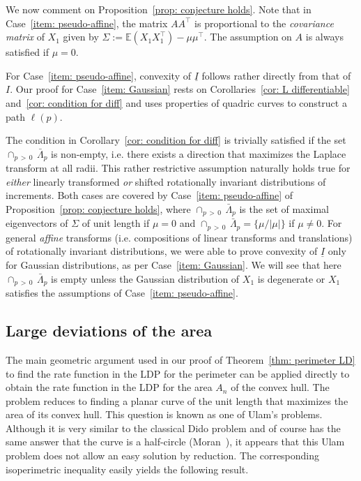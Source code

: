 \documentclass[10pt]{amsart}
\theoremstyle{definition}\newtheorem{defi}[theo]{Definition}\newtheorem{rema}[theo]{Remark}\newtheorem{exam}[theo]{Example}\newtheorem{exem}[theo]{Example}\newtheorem{nota}[theo]{Notation}
\newcommand{\ubar}[1]{\underline{#1}}
\newcommand{\E}{\mathbb{E}}
\begin{document}
We now comment on Proposition~\ref{prop: conjecture holds}. Note that in Case~\eqref{item: pseudo-affine}, the matrix $A A^\top$ is proportional to the \emph{covariance matrix} of $X_1$ given by $\Sigma:=\E (X_1 X_1^\top) - \mu \mu^\top$. The assumption on $A$ is always satisfied if $\mu=0$.

For Case~\eqref{item: pseudo-affine}, convexity of $\ubar I$ follows rather directly from that of $I$. Our proof for Case~\eqref{item: Gaussian} rests on Corollaries~\ref{cor: L differentiable} and~\ref{cor: condition for diff} and uses properties of quadric curves to construct a path $\ell(p)$.

The condition in Corollary~\ref{cor: condition for diff} is trivially satisfied if the set $\cap_{p\,>\,0}\,\bar{\Lambda}_p$ is non-empty, i.e. there exists a direction that maximizes the Laplace transform at all radii. This rather restrictive assumption naturally holds true for \emph{either} linearly transformed \emph{or} shifted rotationally invariant distributions of increments. Both cases are covered by Case~\eqref{item: pseudo-affine} of Proposition~\ref{prop: conjecture holds}, where $\cap_{p\,>\,0}\,\bar{\Lambda}_p$ is the set of maximal eigenvectors of $\Sigma$ of unit length if $\mu=0$ and $\cap_{p\,>\,0}\,\bar{\Lambda}_p = \{\mu /|\mu|\}$ if $\mu \neq 0$. For general \emph{affine} transforms (i.e. compositions of linear transforms and translations) of rotationally invariant distributions, we were able to prove convexity of $\ubar I$ only for Gaussian distributions, as per Case~\eqref{item: Gaussian}. We will see that here $\cap_{p\,>\,0}\,\bar{\Lambda}_p $ is empty unless the Gaussian distribution of $X_1$ is degenerate or $X_1$ satisfies the assumptions of Case~\eqref{item: pseudo-affine}.



\subsection{Large deviations of the area}\label{sec: results area}

The main geometric argument used in our proof of Theorem~\ref{thm: perimeter LD} to find the rate function in the LDP for the perimeter can be applied directly to obtain the rate function in the LDP for the area $A_n$ of the convex hull. The problem reduces to finding a planar curve of the unit length that maximizes the area of its convex hull. This question is known as one of Ulam's problems. Although it is very similar to the classical Dido problem and of course has the same answer that the curve is a half-circle (Moran~\cite{Moran}), it appears that this Ulam problem does not allow an easy solution by reduction. The corresponding isoperimetric inequality easily yields the following result.
\end{document}
